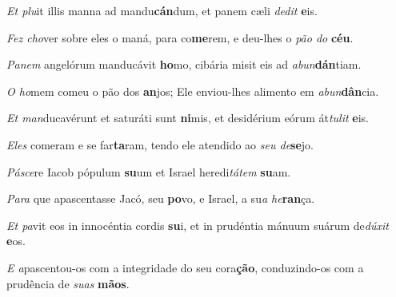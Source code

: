 \begin{greenumerate}
  \switchcolumn*


  \item \textit{Et plu}it illis manna ad mandu\textbf{cán}dum, {\GreStar} et panem cæli \textit{dedit} \textbf{e}is. 

  \switchcolumn%

  \item \textit{Fez cho}ver sobre eles o maná, para co\textbf{me}rem, {\GreStar} e deu-lhes o \textit{pão do} \textbf{céu}. 

  \switchcolumn*


  \item \textit{Panem} angelórum manducávit \textbf{ho}mo, {\GreStar} cibária misit eis ad \textit{abun}\textbf{dán}tiam. 

  \switchcolumn%

  \item \textit{O ho}mem comeu o pão dos \textbf{an}jos; {\GreStar} Ele enviou-lhes alimento em \textit{abun}\textbf{dân}cia. 

  \switchcolumn*


  \item \textit{Et man}ducavérunt et saturáti sunt \textbf{ni}mis, {\GreStar} et desidérium eórum át\textit{tulit} \textbf{e}is. 

  \switchcolumn%

  \item \textit{Eles} comeram e se far\textbf{ta}ram, {\GreStar} tendo ele atendido ao \textit{seu de}\textbf{se}jo. 

  \switchcolumn*


  \item \textit{Pásce}re Iacob pópulum \textbf{su}um {\GreStar} et Israel heredi\textit{tátem} \textbf{su}am. 

  \switchcolumn%

  \item \textit{Para} que apascentasse Jacó, seu \textbf{po}vo, {\GreStar} e Israel, a su\textit{a he}\textbf{ran}ça. 

  \switchcolumn*


  \item \textit{Et pa}vit eos in innocéntia cordis \textbf{su}i, {\GreStar} et in prudéntia mánuum suárum de\textit{dúxit} \textbf{e}os. 

  \switchcolumn%

  \item \textit{E a}pascentou-os com a integridade do seu cora\textbf{ção}, {\GreStar} conduzindo-os com a prudência de \textit{suas} \textbf{mãos}. 
\end{greenumerate}